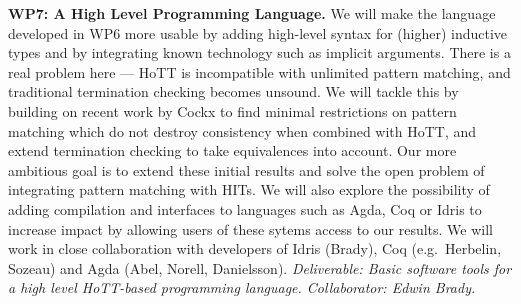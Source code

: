 \documentclass[a4paper,11pt]{article}
\newcommand{\eg}{{e.g.}\ }
\begin{document}
{\bf WP7: A High Level Programming Language.} We will make the
language developed in WP6 more usable by adding high-level syntax for
(higher) inductive types and by integrating known technology such as
implicit arguments. There is a real problem here --- HoTT is
incompatible with unlimited pattern matching, and traditional
termination checking becomes unsound. We will tackle this by building on
recent work by Cockx \cite{cockx-without-k} to find minimal
restrictions on pattern matching which do not destroy consistency when
combined with HoTT, and extend termination checking to take equivalences into account. Our more ambitious goal is to extend these
initial results and solve the open problem of integrating pattern
matching with HITs. We will also explore the possibility of adding
compilation and interfaces to languages such as Agda, Coq or
Idris to increase impact by allowing users of these sytems access to
our results.  We will work in close collaboration with developers of
Idris (Brady), Coq (\eg Herbelin, Sozeau) and Agda (Abel, Norell, Danielsson).  {\em
  Deliverable: Basic software tools for a high level HoTT-based
  programming language.  Collaborator: Edwin Brady.  }




\end{document}
